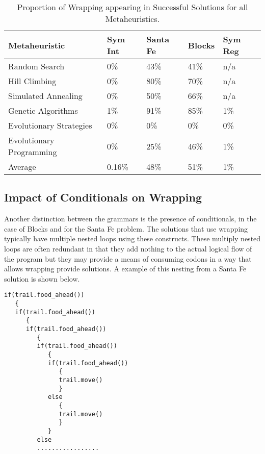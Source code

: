 \begin{table}[h]
\begin{center}
\begin{tabular}{|l|l|l|l|l|}
\hline
Metaheuristic            & Sym Int & Santa Fe & Blocks & Sym Reg  \\
\hline
Random Search            &  0\%    & 43\%    & 41\%   & n/a   \\
Hill Climbing            &  0\%    & 80\%    & 70\%   & n/a  \\
Simulated Annealing      &  0\%    & 50\%    & 66\%   & n/a \\
Genetic Algorithms       &  1\%    & 91\%    & 85\%   & 1\%  \\
Evolutionary Strategies  &  0\%    & 0\%     & 0\%    & 0\%  \\
Evolutionary Programming &  0\%    & 25\%    & 46\%   & 1\% \\
\hline
Average                   & 0.16\%    & 48\%    & 51\%   & 1\% \\ 
\hline
\end{tabular}
\caption{\label{all_wrapping_analysis_table} Proportion of Wrapping appearing in Successful Solutions for all Metaheuristics.}
\end{center}
\end{table}


\subsection{Impact of Conditionals on Wrapping}
Another distinction between the grammars is the presence of conditionals,   \noindent in the case of Blocks and  \noindent for the Santa Fe problem. The solutions that use wrapping typically have multiple nested loops using these constructs. These multiply nested loops are often redundant in that they add nothing to the actual logical flow of the program but they may provide a means of consuming codons in a way that allows wrapping provide solutions. A example of this nesting from a Santa Fe solution is shown below.


\begin{verbatim}
if(trail.food_ahead())
   {
   if(trail.food_ahead())
      {
      if(trail.food_ahead())
         {
         if(trail.food_ahead())
            {
            if(trail.food_ahead())
               {
               trail.move()
               }
            else
               {
               trail.move()
               }
            }
         else
         .................
\end{verbatim}

